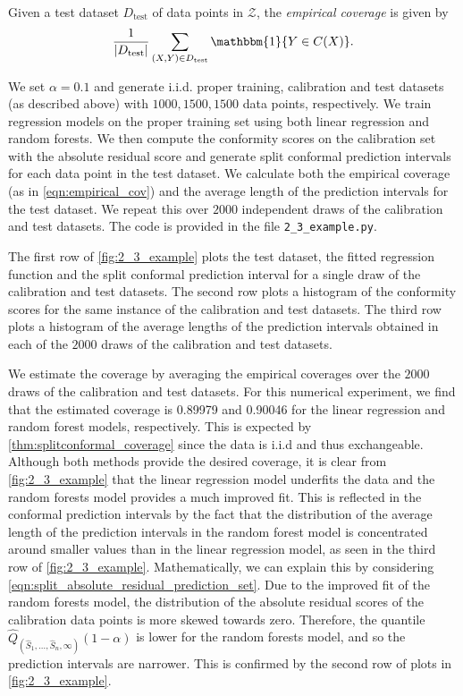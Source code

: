 \documentclass[11pt, titlepage]{article} %
\newcommand{\R}{\mathrm}
\numberwithin{equation}{section}
\theoremstyle{definition}
\numberwithin{theorem}{section}
\numberwithin{lemma}{section}
\numberwithin{corollary}{section}
\numberwithin{proposition}{section}
\numberwithin{definition}{section}
\numberwithin{remark}{section}
\begin{document}
\noindent
Given a test dataset \(D_\R{test}\) of data points in \(\mathcal{Z}\), the \textit{empirical coverage} is given by \begin{equation}
    \frac{1}{|D_\R{test}|} \sum_{(X, Y) \in D_\R{test}} \mathbbm{1}\{ Y \in C(X) \}.
\label{eqn:empirical_cov}
\end{equation}

\noindent
We set \(\alpha = 0.1\) and generate i.i.d. proper training, calibration and test datasets (as described above) with \(1000, 1500, 1500\) data points, respectively. We train regression models on the proper training set using both linear regression and random forests. We then compute the conformity scores on the calibration set with the absolute residual score and generate split conformal prediction intervals for each data point in the test dataset. We calculate both the empirical coverage (as in \eqref{eqn:empirical_cov}) and the average length of the prediction intervals for the test dataset. We repeat this over \(2000\) independent draws of the calibration and test datasets. The code is provided in the file \verb|2_3_example.py|. \vskip5pt

\noindent
The first row of \cref{fig:2_3_example} plots the test dataset, the fitted regression function and the split conformal prediction interval for a single draw of the calibration and test datasets. The second row plots a histogram of the conformity scores for the same instance of the calibration and test datasets. The third row plots a histogram of the average lengths of the prediction intervals obtained in each of the \(2000\) draws of the calibration and test datasets. \vskip5pt

\noindent
We estimate the coverage by averaging the empirical coverages over the \(2000\) draws of the calibration and test datasets. For this numerical experiment, we find that the estimated coverage is 0.89979 and 0.90046 for the linear regression and random forest models, respectively. This is expected by \cref{thm:splitconformal_coverage} since the data is i.i.d and thus exchangeable. Although both methods provide the desired coverage, it is clear from \cref{fig:2_3_example} that the linear regression model underfits the data and the random forests model provides a much improved fit. This is reflected in the conformal prediction intervals by the fact that the distribution of the average length of the prediction intervals in the random forest model is concentrated around smaller values than in the linear regression model, as seen in the third row of \cref{fig:2_3_example}. Mathematically, we can explain this by considering \eqref{eqn:split_absolute_residual_prediction_set}. Due to the improved fit of the random forests model, the distribution of the absolute residual scores of the calibration data points is more skewed towards zero. Therefore, the quantile \(\hat{Q}_{(\hat{S}_1, \ldots, \hat{S}_n, \infty)}(1-\alpha)\) is lower for the random forests model, and so the prediction intervals are narrower. This is confirmed by the second row of plots in \cref{fig:2_3_example}. \vskip5pt
\end{document}
